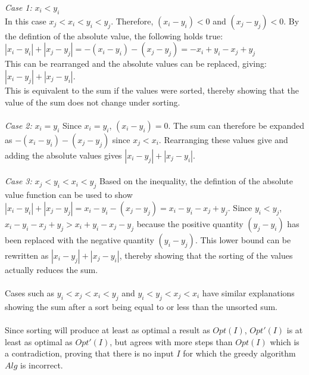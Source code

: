 \documentclass[12pt]{article}
\begin{document}
\textit{Case 1:} $x_i < y_i$\\
In this case $x_j < x_i < y_i < y_j$.  Therefore, $(x_i - y_i) < 0$
and $(x_j - y_j) < 0$.  By the defintion of the absolute value, the following holds
true:\\
$|x_i - y_i| + |x_j - y_j| = -(x_i - y_i) - (x_j - y_j) = -x_i + y_i - x_j + y_j$\\
This can be rearranged and the absolute values can be replaced, giving: $|x_i - y_j| + |x_j - y_i|$.\\
This is equivalent to the sum if the values were sorted, thereby showing that the value
of the sum does not change under sorting.\\\\
\textit{Case 2:} $x_i = y_i$
Since $x_i = y_i$, $(x_i - y_i) = 0$. The sum can therefore be expanded as
$-(x_i - y_i) - (x_j - y_j)$ since $x_j < x_i$.  Rearranging these values
give and adding the absolute values gives $|x_i - y_j| + |x_j - y_i|$.\\\\ 
\textit{Case 3:} $x_j < y_i < x_i < y_j$
Based on the inequality, the defintion of the absolute value function can be used to show
$|x_i - y_i| + |x_j - y_j| = x_i - y_i - (x_j - y_j) = x_i - y_i - x_j + y_j$.  Since 
$y_i < y_j$, $x_i - y_i - x_j + y_j > x_i + y_i - x_j - y_j$ because the positive quantity
$(y_j - y_i)$ has been replaced with the negative quantity $(y_i - y_j)$.  This lower bound
can be rewritten as $|x_i - y_j| + |x_j - y_i|$, thereby showing that the sorting of the
values actually reduces the sum.\\\\
Cases such as $y_i < x_j < x_i < y_j$ and $y_i < y_j < x_j < x_i$ have similar explanations
showing the sum after a sort being equal to or less than the unsorted sum.\\\\
Since sorting will produce at least as optimal a result as $Opt(I)$, $Opt'(I)$ is at least
as optimal as $Opt'(I)$, but agrees with more steps than $Opt(I)$ which is a contradiction,
proving that there is no input $I$ for which the greedy algorithm $Alg$ is incorrect.     
\end{document}
